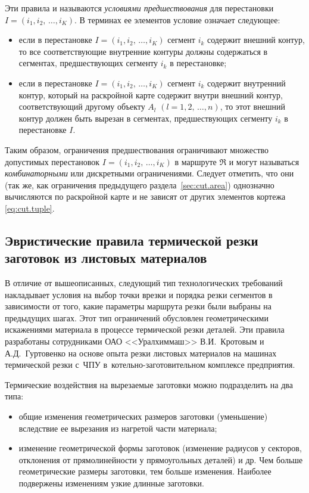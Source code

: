 Эти правила и называются \textit{условиями предшествования}
для перестановки
$ I = (i_1, i_2, \,\dots, i_K)$.
В терминах ее элементов условие означает следующее:
\begin{itemize}
  \item
  если в перестановке
  $ I = (i_1, i_2, \,\dots, i_K)$
  сегмент $i_k$
  содержит внешний контур,
  то все соответствующие внутренние контуры должны содержаться в сегментах,
  предшествующих сегменту $i_k$
  в перестановке;
  \item
  если в перестановке
  $ I = (i_1, i_2, \,\dots, i_K)$
  сегмент $i_k$
  содержит  внутренний контур,
  который на раскройной карте содержит внутри внешний контур,
  соответствующий другому объекту
  $A_l$
  $(l=1,2, \,\dots, n)$,
  то этот внешний контур должен быть вырезан в сегментах,
  предшествующих сегменту $i_k$ в перестановке $I$.
\end{itemize}

Таким образом,
ограничения предшествования ограничивают
множество допустимых перестановок
$ I = (i_1, i_2, \,\dots, i_K)$
в маршруте $\mathfrak R$
и могут называться
\textit{комбинаторными}
или дискретными ограничениями.
Следует отметить,
что они
(так же, как ограничения
предыдущего раздела~\ref{sec:cut.area})
однозначно вычисляются по раскройной карте
и не зависят от других элементов кортежа~
\eqref{eq:cut.tuple}.

\subsection{Эвристические правила термической резки заготовок
из листовых материалов}

В отличие от вышеописанных,
следующий тип технологических требований накладывает условия на
выбор точки врезки и порядка резки сегментов в зависимости от того,
какие параметры маршрута резки были выбраны на предыдущих шагах.
Этот тип ограничений обусловлен геометрическими искажениями материала
в процессе термической резки деталей.
Эти правила разработаны сотрудниками ОАО <<Уралхиммаш>>
В.И.~Кротовым и А.Д.~Гуртовенко
на основе опыта резки листовых материалов на машинах термической резки с~ЧПУ
в~котельно-заготовительном комплексе предприятия.

Термические воздействия на вырезаемые заготовки можно подразделить на два типа:
\begin{itemize}
\item
общие изменения геометрических размеров заготовки (уменьшение)
вследствие ее вырезания из нагретой части материала;
\item
изменение геометрической формы заготовок
(изменение радиусов у секторов,
отклонения от прямолинейности у прямоугольных деталей) и др.
Чем больше геометрические размеры заготовки,
тем больше изменения.
Наиболее  подвержены изменениям узкие длинные заготовки.
\end{itemize}

